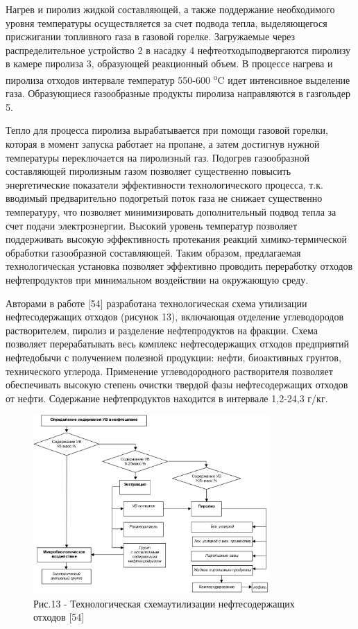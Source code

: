 \begin{multicols}{2}
Нагрев и пиролиз жидкой составляющей, а также поддержание необходимого
уровня температуры осуществляется за счет подвода тепла, выделяющегося
присжигании топливного газа в газовой горелке. Загружаемые через
распределительное устройство 2 в насадку 4 нефтеотходыподвергаются
пиролизу в камере пиролиза 3, образующей реакционный объем. В процессе
нагрева и пиролиза отходов интервале температур 550-600
\textsuperscript{o}C идет интенсивное выделение газа. Образующиеся
газообразные продукты пиролиза направляются в газгольдер 5.

Тепло для процесса пиролиза вырабатывается при помощи газовой горелки,
которая в момент запуска работает на пропане, а затем достигнув нужной
температуры переключается на пиролизный газ. Подогрев газообразной
составляющей пиролизным газом позволяет существенно повысить
энергетические показатели эффективности технологического процесса, т.к.
вводимый предварительно подогретый поток газа не снижает существенно
температуру, что позволяет минимизировать дополнительный подвод тепла за
счет подачи электроэнергии. Высокий уровень температур позволяет
поддерживать высокую эффективность протекания реакций химико-термической
обработки газообразной составляющей. Таким образом, предлагаемая
технологическая установка позволяет эффективно проводить переработку
отходов нефтепродуктов при минимальном воздействии на окружающую среду.

Авторами в работе {[}54{]} разработана технологическая схема утилизации
нефтесодержащих отходов (рисунок 13), включающая отделение углеводородов
растворителем, пиролиз и разделение нефтепродуктов на фракции. Схема
позволяет перерабатывать весь комплекс нефтесодержащих отходов
предприятий нефтедобычи с получением полезной продукции: нефти,
биоактивных грунтов, технического углерода. Применение углеводородного
растворителя позволяет обеспечивать высокую степень очистки твердой фазы
нефтесодержащих отходов от нефти. Содержание нефтепродуктов находится в
интервале 1,2-24,3 г/кг.
\end{multicols}

\begin{figure}[H]
	\centering
	\includegraphics[width=0.8\textwidth]{media/chem2/image76}
	\caption*{Рис.13 - Технологическая схемаутилизации нефтесодержащих
отходов {[}54{]}}
\end{figure}

